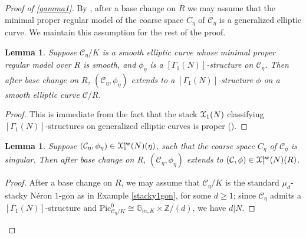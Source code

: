 \documentclass[11pt]{amsart}
\newtheorem{lemma}[subsection]{Lemma}
\theoremstyle{definition}
\begin{document}
\begin{proof}[Proof of \ref{gamma1}]
By \cite[IV.1.6]{DR}, after a base change on $R$ we may assume that the minimal proper regular model of the coarse space $C_\eta$ of ${\mathcal{C}}_\eta$ is a generalized elliptic curve. We maintain this assumption for the rest of the proof.

\begin{lemma}\label{completelysmooth}
Suppose ${\mathcal{C}}_\eta/K$ is a smooth elliptic curve whose minimal proper regular model over $R$ is smooth, and $\phi_\eta$ is a $[\Gamma_1(N)]$-structure on ${\mathcal{C}}_\eta$. Then after base change on $R$, $({\mathcal{C}}_\eta,\phi_\eta)$ extends to a $[\Gamma_1(N)]$-structure $\phi$ on a smooth elliptic curve ${\mathcal{C}}/R$.
\end{lemma}
\begin{proof}
This is immediate from the fact that the stack ${\mathbf{\EuScript{X}}}_1(N)$ classifying $[\Gamma_1(N)]$-structures on generalized elliptic curves is proper (\cite[1.2.1]{C}).
\end{proof}

\begin{lemma}\label{genericnode}
Suppose $({\mathcal{C}}_\eta,\phi_\eta) \in {\mathbf{\EuScript{X}}}^{\mathrm{tw}}_1(N)(\eta)$, such that the coarse space $C_\eta$ of ${\mathcal{C}}_\eta$ is singular. Then after base change on $R$, $({\mathcal{C}}_\eta,\phi_\eta)$ extends to $({\mathcal{C}},\phi) \in {\mathbf{\EuScript{X}}}^{\mathrm{tw}}_1(N)(R)$.
\end{lemma}
\begin{proof}
After a base change on $R$, we may assume that ${\mathcal{C}}_\eta/K$ is the standard $\mu_d$-stacky N\'eron $1$-gon as in Example \ref{stacky1gon}, for some $d\geq 1$; since ${\mathcal{C}}_\eta$ admits a $[\Gamma_1(N)]$-structure and $\mathrm{Pic}^0_{{\mathcal{C}}_\eta/K} \cong \mathbb{G}_{m,K} \times \mathbb{Z}/(d)$, we have $d|N$. 


\end{proof}
\end{proof}
\end{document}
